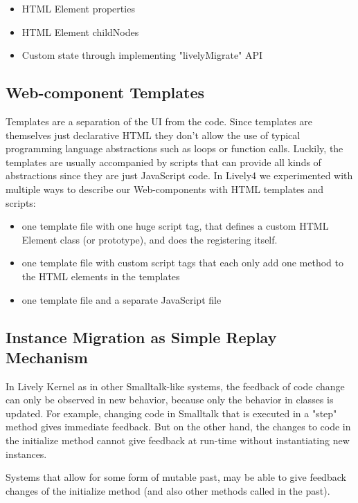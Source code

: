 \begin{itemize}
  \item HTML Element properties
  \item HTML Element childNodes
  \item Custom state through implementing "livelyMigrate" API
\end{itemize}

\subsection{Web-component Templates}

Templates are a separation of the UI from the code. Since templates are themselves just declarative HTML they don't allow the use of typical programming language abstractions such as loops or function calls. Luckily, the templates are usually accompanied by scripts that can provide all kinds of abstractions since they are just JavaScript code. In Lively4 we experimented with multiple ways to describe our Web-components with HTML templates and scripts:

\begin{itemize}
  \item one template file with one huge script tag, that defines a custom HTML Element class (or prototype), and does the registering itself.
  \item one template file with custom script tags that each only add one method to the HTML elements in the templates
  \item one template file and a separate JavaScript file
\end{itemize}


\subsection{Instance Migration as Simple Replay Mechanism}

In Lively Kernel as in other Smalltalk-like systems, the feedback of code change can only be observed in new behavior, because only the behavior in classes is updated. For example, changing code in Smalltalk that is executed in a "step" method gives immediate feedback. But on the other hand, the changes to code in the initialize method cannot give feedback at run-time without instantiating new instances. 

Systems that allow for some form of mutable past, may be able to give feedback changes of the initialize method (and also other methods called in the past).

